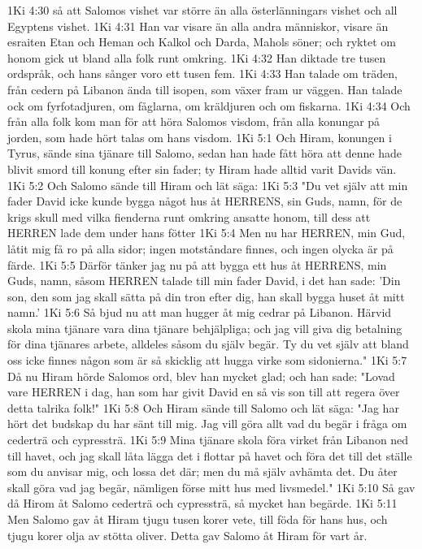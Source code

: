 1Ki 4:30  så att Salomos vishet var större än alla österlänningars vishet och all Egyptens vishet.
1Ki 4:31  Han var visare än alla andra människor, visare än esraiten Etan och Heman och Kalkol och Darda, Mahols söner; och ryktet om honom gick ut bland alla folk runt omkring.
1Ki 4:32  Han diktade tre tusen ordspråk, och hans sånger voro ett tusen fem.
1Ki 4:33  Han talade om träden, från cedern på Libanon ända till isopen, som växer fram ur väggen. Han talade ock om fyrfotadjuren, om fåglarna, om kräldjuren och om fiskarna.
1Ki 4:34  Och från alla folk kom man för att höra Salomos visdom, från alla konungar på jorden, som hade hört talas om hans visdom.
1Ki 5:1  Och Hiram, konungen i Tyrus, sände sina tjänare till Salomo, sedan han hade fått höra att denne hade blivit smord till konung efter sin fader; ty Hiram hade alltid varit Davids vän.
1Ki 5:2  Och Salomo sände till Hiram och lät säga:
1Ki 5:3  "Du vet själv att min fader David icke kunde bygga något hus åt HERRENS, sin Guds, namn, för de krigs skull med vilka fienderna runt omkring ansatte honom, till dess att HERREN lade dem under hans fötter
1Ki 5:4  Men nu har HERREN, min Gud, låtit mig få ro på alla sidor; ingen motståndare finnes, och ingen olycka är på färde.
1Ki 5:5  Därför tänker jag nu på att bygga ett hus åt HERRENS, min Guds, namn, såsom HERREN talade till min fader David, i det han sade: 'Din son, den som jag skall sätta på din tron efter dig, han skall bygga huset åt mitt namn.'
1Ki 5:6  Så bjud nu att man hugger åt mig cedrar på Libanon. Härvid skola mina tjänare vara dina tjänare behjälpliga; och jag vill giva dig betalning för dina tjänares arbete, alldeles såsom du själv begär. Ty du vet själv att bland oss icke finnes någon som är så skicklig att hugga virke som sidonierna."
1Ki 5:7  Då nu Hiram hörde Salomos ord, blev han mycket glad; och han sade: "Lovad vare HERREN i dag, han som har givit David en så vis son till att regera över detta talrika folk!"
1Ki 5:8  Och Hiram sände till Salomo och lät säga: "Jag har hört det budskap du har sänt till mig. Jag vill göra allt vad du begär i fråga om cederträ och cypressträ.
1Ki 5:9  Mina tjänare skola föra virket från Libanon ned till havet, och jag skall låta lägga det i flottar på havet och föra det till det ställe som du anvisar mig, och lossa det där; men du må själv avhämta det. Du åter skall göra vad jag begär, nämligen förse mitt hus med livsmedel."
1Ki 5:10  Så gav då Hirom åt Salomo cederträ och cypressträ, så mycket han begärde.
1Ki 5:11  Men Salomo gav åt Hiram tjugu tusen korer vete, till föda för hans hus, och tjugu korer olja av stötta oliver. Detta gav Salomo åt Hiram för vart år.
